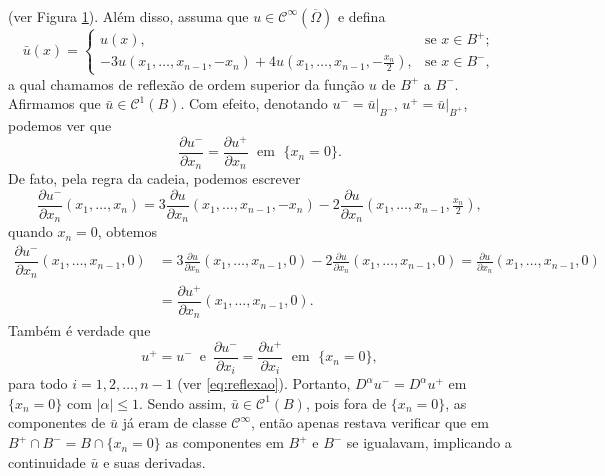 \documentclass[a4paper, 11pt]{book}
\theoremstyle{definition}
\newcommand{\cC}{\mathcal{C}}
\begin{document}
\begin{prf}
\begin{figure}
\begin{tikzpicture}[scale=1.25]
        \end{tikzpicture}
        \caption{~}
        \label{fig:BmaisBmenos}
    \end{figure}
    (ver Figura \ref{fig:BmaisBmenos}).
    Além disso, assuma que $u \in \cC^\infty(\overline\Omega)$ e defina
    \begin{equation} \label{eq:barux}
        \bar u(x) =
        \left\{ 
            \begin{array}{ll}
                u(x), & \text{se } x\in B^+;\\
                -3u(x_1,\dots,x_{n-1}, -x_n) + 4u(x_1,\dots,x_{n-1},-\frac{x_n}{2}), & \text{se } x \in B^-,
            \end{array}
        \right.
    \end{equation}
    a qual chamamos de reflexão de ordem superior da função $u$ de $B^+$ a $B^-$.
    Afirmamos que $\bar u \in \cC^1(B)$.
    Com efeito, denotando $u^- = \bar u \big|_{B^-}$, $u^+ = \bar u \big|_{B^+}$, podemos ver que
    \[
        \dfrac{\partial u^-}{\partial x_n} = \dfrac{\partial u^+}{\partial x_n} \;\text{ em }\; \{x_n = 0\}.
    \]
    De fato, pela regra da cadeia, podemos escrever
    \[
        \dfrac{\partial u^-}{\partial x_n}(x_1,\dots,x_n) = 3 \frac{\partial u}{\partial x_n}(x_1,\dots,x_{n-1}, -x_n)  - 2\frac{\partial u}{\partial x_n}(x_1,\dots,x_{n-1},\tfrac{x_n}{2}),
    \]
    quando $x_n = 0$, obtemos
    \[
        \begin{aligned}
            \dfrac{\partial u^-}{\partial x_n}(x_1,\dots,x_{n-1},0)
         &= 3\frac{\partial u}{\partial x_n}(x_1,\dots,x_{n-1},0) - 2\frac{\partial u}{\partial x_n}(x_1,\dots,x_{n-1},0) = \frac{\partial u}{\partial x_n}(x_1,\dots,x_{n-1},0)\\[5pt] 
         &= \dfrac{\partial u^+}{\partial x_n}(x_1,\dots,x_{n-1},0).
        \end{aligned}
    \]
    Também é verdade que
    \[
        u^+ = u^- \,\text{ e }\, \dfrac{\partial u^-}{\partial x_i} = \dfrac{\partial u^+}{\partial x_i}  \;\text{ em }\; \{x_n = 0\},
    \]
    para todo $i = 1,2,\dots,n-1$ (ver \ref{eq:reflexao}). Portanto, $D^\alpha u^- = D^\alpha u^+$ em $\{x_n = 0\}$ com $|\alpha| \leqslant 1$. Sendo assim, $\bar u \in \cC^1 (B)$, pois fora de $\{x_n = 0\}$, as componentes de $\bar u$ já eram de classe $\cC^\infty$, então apenas restava verificar que em $B^+ \cap B^- = B \cap \{x_n = 0\}$ as componentes em $B^+$ e $B^-$ se igualavam, implicando a continuidade $\bar u$ e suas derivadas.


\end{prf}
\end{document}
